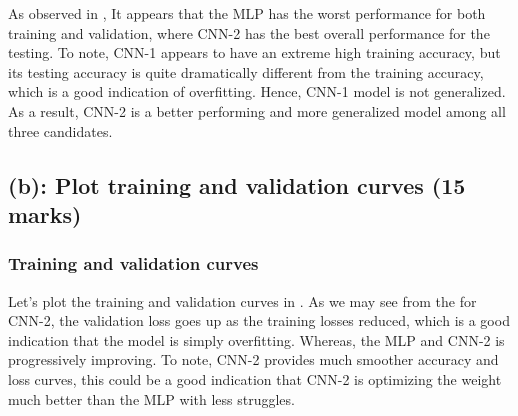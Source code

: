 \documentclass{tron}
\begin{document}
As observed in , It appears that the MLP has the worst performance for both training and validation, where CNN-2 has the best overall performance for the testing. To note, CNN-1 appears to have an extreme high training accuracy, but its testing accuracy is quite dramatically different from the training accuracy, which is a good indication of overfitting. Hence, CNN-1 model is not generalized. As a result, CNN-2 is a better performing and more generalized model among all three candidates. 

\newpage
\subsection{(b): Plot training and validation curves (15 marks)}
\subsubsection{Training and validation curves}
Let's plot the training and validation curves in . As we may see from the  for CNN-2, the validation loss goes up as the training losses reduced, which is a good indication that the model is simply overfitting. Whereas, the MLP and CNN-2 is progressively improving. To note, CNN-2 provides much smoother accuracy and loss curves, this could be a good indication that CNN-2 is optimizing the weight much better than the MLP with less struggles.
\end{document}
